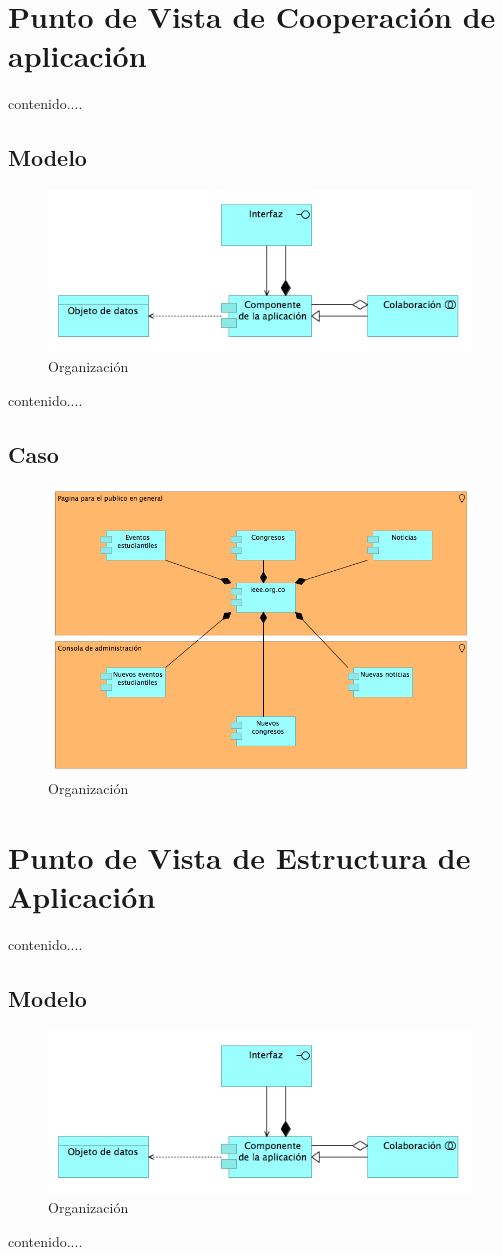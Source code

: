 \section{Punto de Vista de Cooperación de aplicación}
contenido....
\subsection{Modelo}
\begin{figure}[th!]
	\centering
	\includegraphics[width=0.8\linewidth]{arquitectura_diseno/imgs/M_CoperacionAplicacion}
	\caption{Organización}
\end{figure}
\newpage
contenido....
\subsection{Caso}
\begin{figure}[th!]
	\centering
	\includegraphics[width=0.8\linewidth]{arquitectura_diseno/imgs/C_CoperacionAplicacion}
	\caption{Organización}
\end{figure}
\newpage
\section{Punto de Vista de Estructura de Aplicación}
contenido....
\subsection{Modelo}
\begin{figure}[th!]
	\centering
	\includegraphics[width=0.8\linewidth]{arquitectura_diseno/imgs/M_EstructuraAplicacion}
	\caption{Organización}
\end{figure}
\newpage
contenido....
